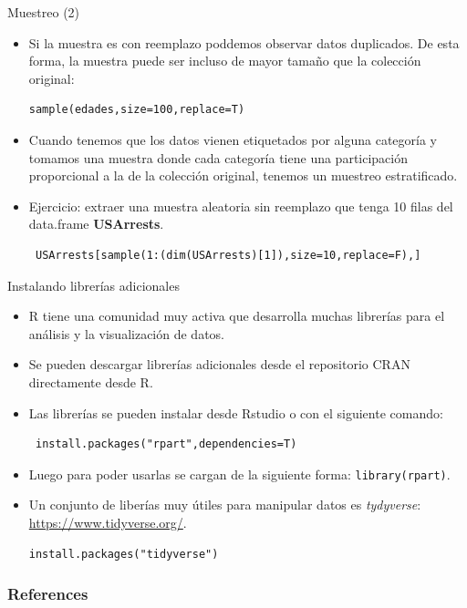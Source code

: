 \documentclass[handout]{beamer}
\begin{document}
\begin{frame}[fragile]{Muestreo (2)}
\scriptsize{
\begin{itemize}
 \item Si la muestra es con reemplazo poddemos observar datos duplicados. De esta forma, la muestra puede ser incluso de mayor tamaño que la colección original: 

\begin{verbatim}
sample(edades,size=100,replace=T)
\end{verbatim}
 
 \item Cuando tenemos que los datos vienen etiquetados por alguna categoría y tomamos una muestra donde cada categoría tiene una participación proporcional a la de la colección original, tenemos un muestreo estratificado. 
 
 \item Ejercicio: extraer una muestra aleatoria sin reemplazo que tenga 10 filas del data.frame \textbf{USArrests}. \pause
 
 \begin{verbatim}
 USArrests[sample(1:(dim(USArrests)[1]),size=10,replace=F),]
 \end{verbatim}

\end{itemize}



}
\end{frame}






\begin{frame}[fragile]{Instalando librerías adicionales}
\scriptsize{
\begin{itemize}
 \item R tiene una comunidad muy activa que desarrolla muchas librerías para el análisis y la visualización de datos.
 \item Se pueden descargar librerías adicionales desde el repositorio CRAN directamente desde R.
 \item Las librerías se pueden instalar desde Rstudio o con el siguiente comando:
 \begin{verbatim}
 install.packages("rpart",dependencies=T)
\end{verbatim} 

\item Luego para poder usarlas se cargan de la siguiente forma: \verb+library(rpart)+.

\item Un conjunto de liberías muy útiles para manipular datos es \textit{tydyverse}:  \url{https://www.tidyverse.org/}.

 \begin{verbatim}
install.packages("tidyverse")
\end{verbatim} 


 
 \end{itemize}

 
}
 
\end{frame}




\begin{frame}[allowframebreaks]\scriptsize
\frametitle{References}


%
\end{frame}  






\end{document}
